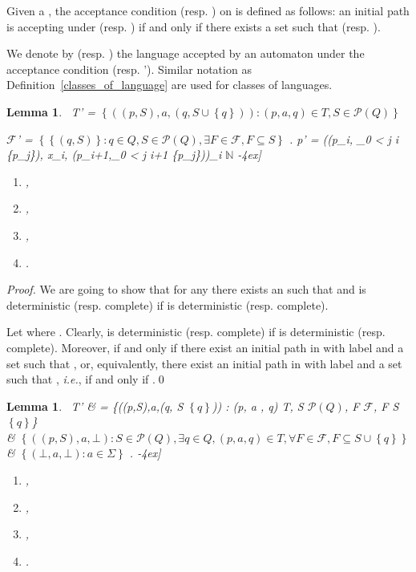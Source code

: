 \documentclass[preprint]{elsarticle}
\makeatletter
\newcommand{\N}{\ensuremath{\mathbb{N}}\xspace}
\newcommand{\powerset}[1]{\ensuremath{\mathcal{P}\left( #1 \right)}\xspace}
\newcommand{\calF}{\ensuremath{\mathcal{F}}\xspace}
\newcommand{\set}[1]{\ensuremath{\left\{ #1  \right\}}\xspace}
\newcommand{\ie}{\emph{i.e.}\@\xspace}
\newtheorem{lemma}[theorem]{Lemma}
\makeatother
\begin{document}
\begin{definition}
Given a  , the
acceptance condition  (resp. ) on   is defined as follows: an initial path  is accepting under  (resp. ) if and only if there exists a set 
 such that  (resp. ).
\end{definition}

We denote by  (resp. ) the language accepted by an automaton  under the acceptance condition  (resp. '). Similar notation as Definition~\ref{classes_of_language} are used for classes of languages.

\begin{lemma}\label{aap}\mbox{\phantom{Q}}\
T' = \set{((p,S),a,(q, S \cup \set{q})) : (p, a , q) \in T, S \in \powerset{Q}}

\calF' = \set{\set{(q, S)} : q \in Q, S \in \powerset{Q}, \exists F \in \calF, F \subseteq S} \enspace.
p' = ((p_i, \bigcup_{0 < j \leq i } \{p_j\}), x_i, (p_{i+1},\bigcup_{0 < j \leq i+1} \{p_j\}))_{i \in \N}
-4ex]
\begin{enumerate}
\item
\enspace, 
\item
\enspace, 
\item
\enspace,
\item
\enspace.
\end{enumerate}
\end{lemma}

\begin{proof}
We are going to show that for any   there exists an   such that  and  is deterministic (resp. complete) if  is deterministic (resp. complete). 

Let  where . Clearly,  is deterministic (resp. complete) if  is deterministic (resp. complete). Moreover,  if and only if there exist an initial path  in  with label  and a set  such that , or, equivalently,  there exist an initial path  in  with label  and a set  such that , \ie, if and only if .\qed
\end{proof}

\begin{lemma}\label{aprime}\mbox{\phantom{Q}}\
T' & =  \left\{((p,S),a,(q, S \cup \set{q})) : (p, a , q) \in T, S \in \powerset{Q}, \exists F \in \calF, F \not\subseteq S \cup \set{q}\right\} \\
 & \bigcup  \set{((p,S),a,\bot) : S \in \powerset{Q}, \exists q \in Q, (p, a , q) \in T, \forall F \in \calF, F \subseteq S \cup \set{q}} \\
 & \bigcup  \set{(\bot, a, \bot) : a \in \Sigma} \enspace.
-4ex]
\begin{enumerate}
\item
\enspace,
\item
\enspace,
\item
\enspace,
\item
\enspace.
\end{enumerate}
\end{lemma}
\end{document}
